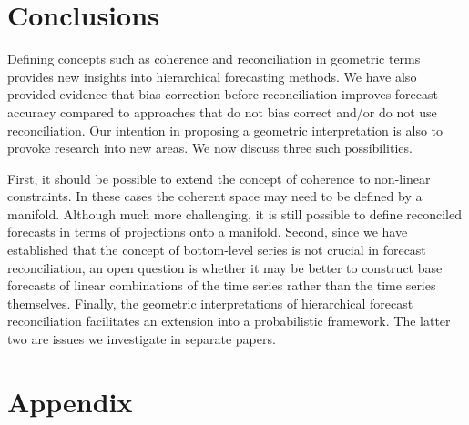 \documentclass[12pt]{article}
\theoremstyle{definition}
\begin{document}
\section{Conclusions}\label{sec:conclusions}


Defining concepts such as coherence and reconciliation in geometric terms provides new insights into hierarchical forecasting methods. We have also provided evidence that bias correction before reconciliation improves forecast accuracy compared to approaches that do not bias correct and/or do not use reconciliation. Our intention in proposing a geometric interpretation is also to provoke research into new areas. We now discuss three such possibilities.

First, it should be possible to extend the concept of coherence to non-linear constraints. In these cases the coherent space may need to be defined by a manifold. Although much more challenging, it is still possible to define reconciled forecasts in terms of projections onto a manifold. Second, since we have established that the concept of bottom-level series is not crucial in forecast reconciliation, an open question is whether it may be better to construct base forecasts of linear combinations of the time series rather than the time series themselves. Finally, the geometric interpretations of hierarchical forecast reconciliation facilitates an extension into a probabilistic framework. The latter two are issues we investigate in separate papers.

\clearpage
\appendix

\section{Appendix}
\end{document}
